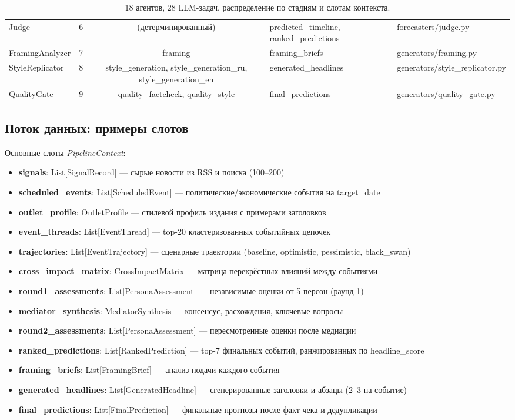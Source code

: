 \begin{table}[h]
\begin{tabular}{|l|l|c|l|l|}
Judge & 6 & (детерминированный) & predicted\_timeline, ranked\_predictions & forecasters/judge.py \\
FramingAnalyzer & 7 & framing & framing\_briefs & generators/framing.py \\
StyleReplicator & 8 & style\_generation, style\_generation\_ru, style\_generation\_en & generated\_headlines & generators/style\_replicator.py \\
QualityGate & 9 & quality\_factcheck, quality\_style & final\_predictions & generators/quality\_gate.py \\
\hline
\end{tabular}
\caption{18 агентов, 28 LLM-задач, распределение по стадиям и слотам контекста.}
\label{tab:agents_full}
\end{table}

\subsection{Поток данных: примеры слотов}


Основные слоты \emph{PipelineContext}:

\begin{itemize}[nosep]
\item \textbf{signals}: List[SignalRecord] — сырые новости из RSS и поиска (100–200)
\item \textbf{scheduled\_events}: List[ScheduledEvent] — политические/экономические события на target\_date
\item \textbf{outlet\_profile}: OutletProfile — стилевой профиль издания с примерами заголовков
\item \textbf{event\_threads}: List[EventThread] — top-20 кластеризованных событийных цепочек
\item \textbf{trajectories}: List[EventTrajectory] — сценарные траектории (baseline, optimistic, pessimistic, black\_swan)
\item \textbf{cross\_impact\_matrix}: CrossImpactMatrix — матрица перекрёстных влияний между событиями
\item \textbf{round1\_assessments}: List[PersonaAssessment] — независимые оценки от 5 персон (раунд 1)
\item \textbf{mediator\_synthesis}: MediatorSynthesis — консенсус, расхождения, ключевые вопросы
\item \textbf{round2\_assessments}: List[PersonaAssessment] — пересмотренные оценки после медиации
\item \textbf{ranked\_predictions}: List[RankedPrediction] — top-7 финальных событий, ранжированных по headline\_score
\item \textbf{framing\_briefs}: List[FramingBrief] — анализ подачи каждого события
\item \textbf{generated\_headlines}: List[GeneratedHeadline] — сгенерированные заголовки и абзацы (2–3 на событие)
\item \textbf{final\_predictions}: List[FinalPrediction] — финальные прогнозы после факт-чека и дедупликации
\end{itemize}

